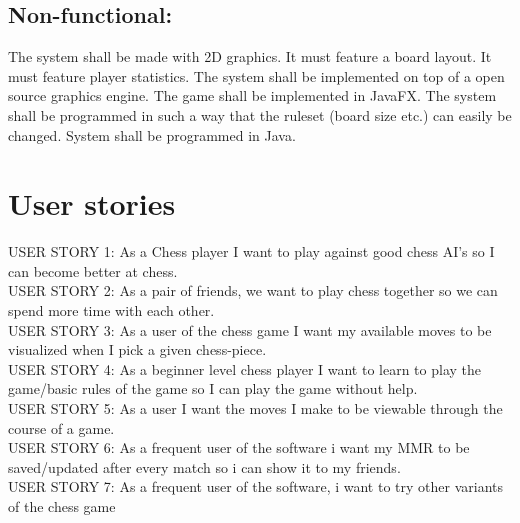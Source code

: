 \documentclass{article}
\begin{document}
    \subsection{Non-functional:}
    \begin{outline}
          \1 The system shall be made with 2D graphics.
          \2 It must feature a board layout.
          \2 It must feature player statistics.
          \1 The system shall be implemented on top of a open source graphics engine.
          \2 The game shall be implemented in JavaFX.
          \1 The system shall be programmed in such a way that the ruleset (board size etc.) can easily be changed.
          \1 System shall be programmed in Java.
    \end{outline}

    \section{User stories}
        USER STORY 1: As a Chess player I want to play against good chess AI’s
        so I can become better at chess. \\

        \noindent
        USER STORY 2: As a pair of friends, we want to play chess together so we
        can spend more time with each other. \\

        \noindent
        USER STORY 3: As a user of the chess game I want my available moves to
        be visualized when I pick a given chess-piece. \\

        \noindent
        USER STORY 4: As a beginner level chess player I want to learn to play
        the game/basic rules of the game so I can play the game without help. \\

        \noindent
        USER STORY 5: As a user I want the moves I make to be viewable through
        the course of a game. \\

        \noindent
        USER STORY 6: As a frequent user of the software i want my MMR to be
        saved/updated after every match so i can show it to my friends. \\

           \noindent
        USER STORY 7: As a frequent user of the software, i want to try other variants of the chess game \\


	\vspace{30mm}
\end{document}
